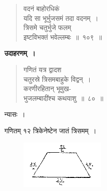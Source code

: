 \documentclass[11pt, openany]{book}
\begin{document}
\newpage%

\begin{quote}
    \bs 
 वदनं बाहोरधिकं\\
यदि सा भूर्भुजसमं तदा वदनम्~। \\
त्रिसमे चतुर्भुजे फलम् \\
इष्टविभक्तं भवेल्लम्बः~॥~१०९~॥~
\end{quote}

 \textbf{उदाहरणम्~।} 
 
\begin{quote}
    \bqt 
     गणितं यत्र द्वादश\\
चतुरस्रे त्रिसमबाहुके विद्वन्~। \\
करणीरहितान् भूमुख-\\
भुजलम्बादींश्च कथयाशु~॥~८०~॥~
\end{quote}

 न्यासः~। \\
\vspace{-4mm}

गणितम् १२ त्रिकेनेष्टेन जातं त्रिसमम्~। 
\vspace{-2mm}

\begin{figure}[h!]
     \centering
     \includegraphics[scale=0.9]{graphics/capture125.png}
\end{figure}
\vspace{-2mm}
\end{document}
